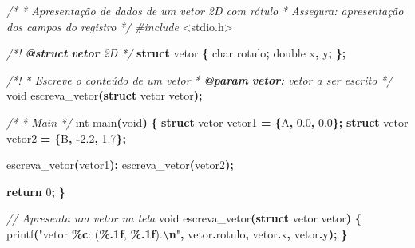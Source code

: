 \documentclass[
  11pt,
  a4paper,
]{scrbook}
\newenvironment{Shaded}{\begin{snugshade}}{\end{snugshade}}
\newcommand{\AnnotationTok}[1]{\textcolor[rgb]{0.56,0.35,0.01}{\textbf{\textit{#1}}}}
\newcommand{\CharTok}[1]{\textcolor[rgb]{0.31,0.60,0.02}{#1}}
\newcommand{\CommentTok}[1]{\textcolor[rgb]{0.56,0.35,0.01}{\textit{#1}}}
\newcommand{\CommentVarTok}[1]{\textcolor[rgb]{0.56,0.35,0.01}{\textbf{\textit{#1}}}}
\newcommand{\ControlFlowTok}[1]{\textcolor[rgb]{0.13,0.29,0.53}{\textbf{#1}}}
\newcommand{\DataTypeTok}[1]{\textcolor[rgb]{0.13,0.29,0.53}{#1}}
\newcommand{\DecValTok}[1]{\textcolor[rgb]{0.00,0.00,0.81}{#1}}
\newcommand{\FloatTok}[1]{\textcolor[rgb]{0.00,0.00,0.81}{#1}}
\newcommand{\ImportTok}[1]{#1}
\newcommand{\KeywordTok}[1]{\textcolor[rgb]{0.13,0.29,0.53}{\textbf{#1}}}
\newcommand{\NormalTok}[1]{#1}
\newcommand{\OperatorTok}[1]{\textcolor[rgb]{0.81,0.36,0.00}{\textbf{#1}}}
\newcommand{\PreprocessorTok}[1]{\textcolor[rgb]{0.56,0.35,0.01}{\textit{#1}}}
\newcommand{\SpecialCharTok}[1]{\textcolor[rgb]{0.81,0.36,0.00}{\textbf{#1}}}
\newcommand{\StringTok}[1]{\textcolor[rgb]{0.31,0.60,0.02}{#1}}
\begin{document}
\begin{Shaded}
\begin{Highlighting}[]
\CommentTok{/*}
\CommentTok{ * Apresentação de dados de um vetor 2D com rótulo}
\CommentTok{ * Assegura: apresentação dos campos do registro}
\CommentTok{ */}
\PreprocessorTok{\#include }\ImportTok{\textless{}stdio.h\textgreater{}}

\CommentTok{/*! }\AnnotationTok{@struct}\CommentTok{ }\CommentVarTok{vetor}\CommentTok{ 2D */}
\KeywordTok{struct}\NormalTok{ vetor }\OperatorTok{\{}
    \DataTypeTok{char}\NormalTok{ rotulo}\OperatorTok{;}
    \DataTypeTok{double}\NormalTok{ x}\OperatorTok{,}\NormalTok{ y}\OperatorTok{;}
\OperatorTok{\};}

\CommentTok{/*!}
\CommentTok{ * Escreve o conteúdo de um vetor}
\CommentTok{ * }\AnnotationTok{@param}\CommentTok{ }\CommentVarTok{vetor:}\CommentTok{ vetor a ser escrito}
\CommentTok{ */}
\DataTypeTok{void}\NormalTok{ escreva\_vetor}\OperatorTok{(}\KeywordTok{struct}\NormalTok{ vetor vetor}\OperatorTok{);}

\CommentTok{/*}
\CommentTok{ * Main}
\CommentTok{ */}
\DataTypeTok{int}\NormalTok{ main}\OperatorTok{(}\DataTypeTok{void}\OperatorTok{)} \OperatorTok{\{}
    \KeywordTok{struct}\NormalTok{ vetor vetor1 }\OperatorTok{=} \OperatorTok{\{}\CharTok{\textquotesingle{}A\textquotesingle{}}\OperatorTok{,} \FloatTok{0.0}\OperatorTok{,} \FloatTok{0.0}\OperatorTok{\};}
    \KeywordTok{struct}\NormalTok{ vetor vetor2 }\OperatorTok{=} \OperatorTok{\{}\CharTok{\textquotesingle{}B\textquotesingle{}}\OperatorTok{,} \OperatorTok{{-}}\FloatTok{2.2}\OperatorTok{,} \FloatTok{1.7}\OperatorTok{\};}

\NormalTok{    escreva\_vetor}\OperatorTok{(}\NormalTok{vetor1}\OperatorTok{);}
\NormalTok{    escreva\_vetor}\OperatorTok{(}\NormalTok{vetor2}\OperatorTok{);}

    \ControlFlowTok{return} \DecValTok{0}\OperatorTok{;}
\OperatorTok{\}}

\CommentTok{// Apresenta um vetor na tela}
\DataTypeTok{void}\NormalTok{ escreva\_vetor}\OperatorTok{(}\KeywordTok{struct}\NormalTok{ vetor vetor}\OperatorTok{)} \OperatorTok{\{}
\NormalTok{    printf}\OperatorTok{(}\StringTok{"vetor }\SpecialCharTok{\%c}\StringTok{: (}\SpecialCharTok{\%.1f}\StringTok{, }\SpecialCharTok{\%.1f}\StringTok{).}\SpecialCharTok{\textbackslash{}n}\StringTok{"}\OperatorTok{,}\NormalTok{ vetor}\OperatorTok{.}\NormalTok{rotulo}\OperatorTok{,}\NormalTok{ vetor}\OperatorTok{.}\NormalTok{x}\OperatorTok{,}\NormalTok{ vetor}\OperatorTok{.}\NormalTok{y}\OperatorTok{);}
\OperatorTok{\}}
\end{Highlighting}
\end{Shaded}
\end{document}
